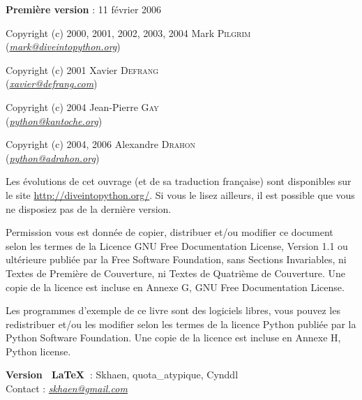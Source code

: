 \documentclass[a4paper,french,11pt,twoside]{book}
\begin{document}

\bigskip
\noindent \textbf{Première version} : 11 février 2006

\medskip
\noindent Copyright (c) 2000, 2001, 2002, 2003, 2004 Mark \textsc{Pilgrim} \\ (\href{mailto:mark@diveintopython.org}{\textit{mark@diveintopython.org}})

\medskip
\noindent Copyright (c) 2001 Xavier \textsc{Defrang}\\(\href{mailto:xavier@defrang.com}{\textit{xavier@defrang.com}})

\medskip
\noindent Copyright (c) 2004 Jean-Pierre \textsc{Gay}\\(\href{mailto:python@kantoche.org}{\textit{python@kantoche.org}})

\medskip
\noindent Copyright (c) 2004, 2006 Alexandre \textsc{Drahon}\\(\href{mailto:python@adrahon.org}{\textit{python@adrahon.org}})

\medskip
Les évolutions de cet ouvrage (et de sa traduction française) sont disponibles sur le site \url{http://diveintopython.org/}. Si vous le lisez ailleurs, il est possible que vous ne disposiez pas de la dernière version.

\medskip
\noindent Permission vous est donnée de copier, distribuer et/ou modifier ce document selon les termes de la Licence GNU Free Documentation License, Version 1.1 ou ultérieure publiée par la Free Software Foundation, sans Sections Invariables, ni Textes de Première de Couverture, ni Textes de Quatrième de Couverture. Une copie de la licence est incluse en Annexe G, GNU Free Documentation License.

\medskip
\noindent Les programmes d'exemple de ce livre sont des logiciels libres, vous pouvez les redistribuer et/ou les modifier selon les termes de la licence Python publiée par la Python Software Foundation. Une copie de la licence est incluse en Annexe H, Python license.

\bigskip
\noindent \textbf{Version ~\LaTeX~}: Skhaen, quota\_atypique, Cynddl \\
\noindent Contact : \href{mailto:skhaen@gmail.com}{\textit{skhaen@gmail.com}}

\newpage
\tableofcontents
\newpage




%
%
%
%
%
\end{document}
